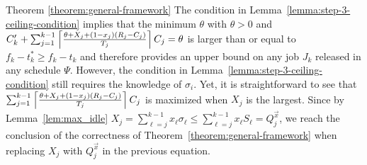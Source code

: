 \begin{appProof}{Theorem \ref{theorem:general-framework}} 
The condition in Lemma~\ref{lemma:step-3-ceiling-condition} implies that the minimum $\theta$ with $\theta > 0$ and
$C_k'+\sum_{j=1}^{k-1} \left\lceil{\frac{\theta+X_j+(1-x_j)(R_j-C_j)}{T_j}}\right\rceil C_j = \theta$
 is larger than or equal to $f_k-t_k^* \geq f_k-t_k$ and therefore provides an upper bound on any job $J_k$ released in any schedule $\Psi$. 
However, the condition in Lemma~\ref{lemma:step-3-ceiling-condition}
still requires the knowledge of $\sigma_i$. Yet, it is straightforward to see
that $\sum_{j=1}^{k-1}
\left\lceil{\frac{\theta+X_j+(1-x_j)(R_j-C_j)}{T_j}}\right\rceil C_j$ is maximized when $X_j$ is the largest. Since by Lemma~\ref{lem:max_idle} $X_j = \sum_{\ell=j}^{k-1} x_\ell\sigma_\ell \leq \sum_{\ell=j}^{k-1} x_\ell S_\ell = Q_j^{\vec{x}}$, we reach the conclusion of the correctness
of Theorem~\ref{theorem:general-framework} when replacing $X_j$ with $Q_j^{\vec{x}}$ in the previous equation.
\end{appProof}

